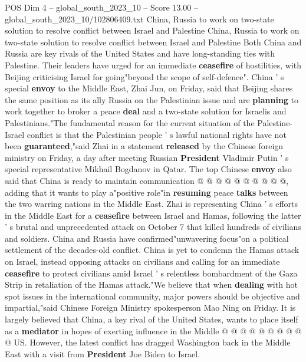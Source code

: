\begin{textsample}{POS Dim 4 – global\_south\_2023\_10 – Score 13.00 – global\_south\_2023\_10/102806409.txt}  \label{ex:f4_pos_432}
China, Russia to work on two-state solution to resolve conflict between Israel and Palestine China, Russia to work on two-state solution to resolve conflict between Israel and Palestine Both China and Russia are key rivals of the United States and have long-standing ties with Palestine.
Their leaders have urged for an immediate \textbf{ceasefire} of hostilities, with Beijing criticising Israel for going"beyond the scope of self-defence".
China ' s special \textbf{envoy} to the Middle East, Zhai Jun, on Friday, said that Beijing shares the same position as its ally Russia on the Palestinian issue and are \textbf{planning} to work together to broker a peace \textbf{deal} and a two-state solution for Israelis and Palestinians."The fundamental reason for the current situation of the Palestine-Israel conflict is that the Palestinian people ' s lawful national rights have not been \textbf{guaranteed},"said Zhai in a statement \textbf{released} by the Chinese foreign ministry on Friday, a day after meeting Russian \textbf{President} Vladimir Putin ' s special representative Mikhail Bogdanov in Qatar.
The top Chinese \textbf{envoy} also said that China is ready to maintain communication @ @ @ @ @ @ @ @ @ @, adding that it wants to play a"positive role"in \textbf{resuming} peace \textbf{talks} between the two warring nations in the Middle East.
Zhai is representing China ' s efforts in the Middle East for a \textbf{ceasefire} between Israel and Hamas, following the latter ' s brutal and unprecedented attack on October 7 that killed hundreds of civilians and soldiers.
China and Russia have confirmed"unwavering focus"on a political settlement of the decades-old conflict.
China is yet to condemn the Hamas attack on Israel, instead opposing attacks on civilians and calling for an immediate \textbf{ceasefire} to protect civilians amid Israel ' s relentless bombardment of the Gaza Strip in retaliation of the Hamas attack."We believe that when \textbf{dealing} with hot spot issues in the international community, major powers should be objective and impartial,"said Chinese Foreign Ministry spokesperson Mao Ning on Friday.
It is largely believed that China, a key rival of the United States, wants to place itself as a \textbf{mediator} in hopes of exerting influence in the Middle @ @ @ @ @ @ @ @ @ @ US.
However, the latest conflict has dragged Washington back in the Middle East with a visit from \textbf{President} Joe Biden to Israel.

\end{textsample}
